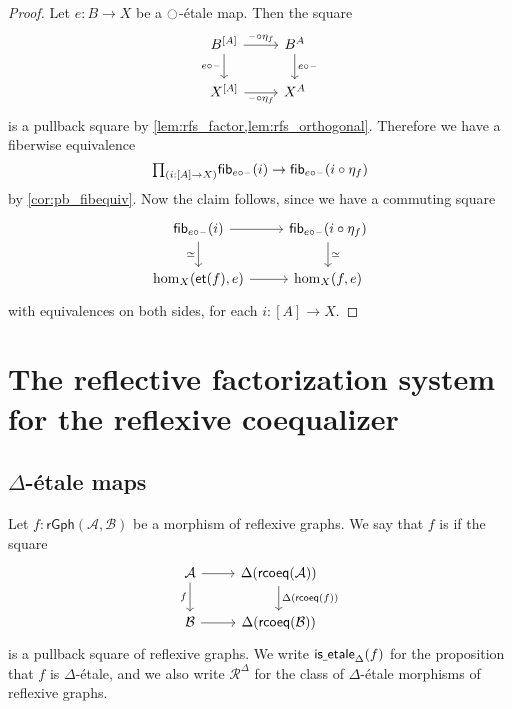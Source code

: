 \begin{proof}
Let $e:B\to X$ be a ${\ocircle}$-\'etale map. Then the square
\begin{equation*}
\begin{tikzcd}
B^{[A]} \arrow[r,"\blank\circ\eta_f"] \arrow[d,swap,"e\circ\blank"] & B^A \arrow[d,"e\circ\blank"] \\
X^{[A]} \arrow[r,swap,"\blank\circ\eta_f"] & X^A
\end{tikzcd}
\end{equation*}
is a pullback square by \cref{lem:rfs_factor,lem:rfs_orthogonal}. Therefore we have a fiberwise equivalence
\begin{equation*}
\prd{i:[A]\to X} \fib{e\circ\blank}{i}\to \fib{e\circ\blank}{i\circ\eta_f}
\end{equation*}
by \cref{cor:pb_fibequiv}. Now the claim follows, since we have a commuting square
\begin{equation*}
\begin{tikzcd}
\fib{e\circ\blank}{i} \arrow[r] \arrow[d,swap,"\eqvsym"] & \fib{e\circ\blank}{i\circ\eta_f} \arrow[d,"\eqvsym"] \\
\mathrm{hom}_X(\mathsf{et}(f),e) \arrow[r] & \mathrm{hom}_X(f,e)
\end{tikzcd}
\end{equation*}
with equivalences on both sides, for each $i:[A]\to X$.
\end{proof}
 
\section{The reflective factorization system for the reflexive coequalizer}

\subsection{\texorpdfstring{$\Delta$}{Δ}-\'etale maps}


\begin{defn}
Let $f:\mathsf{rGph}(\mathcal{A},\mathcal{B})$ be a morphism of reflexive graphs. We say that $f$ is  if the square
\begin{equation*}
\begin{tikzcd}
\mathcal{A} \arrow[d,swap,"f"] \arrow[r] & \Delta(\rcoeq(\mathcal{A})) \arrow[d,"\Delta(\rcoeq(f))"] \\
\mathcal{B} \arrow[r] & \Delta(\rcoeq(\mathcal{B}))
\end{tikzcd}
\end{equation*}
is a pullback square of reflexive graphs. We write $\mathsf{is\underline{\ }{}etale}_\Delta(f)$ for the proposition that $f$ is $\Delta$-\'etale, and we also write $\mathcal{R}^\Delta$ for the class of $\Delta$-\'etale morphisms of reflexive graphs.
\end{defn}

